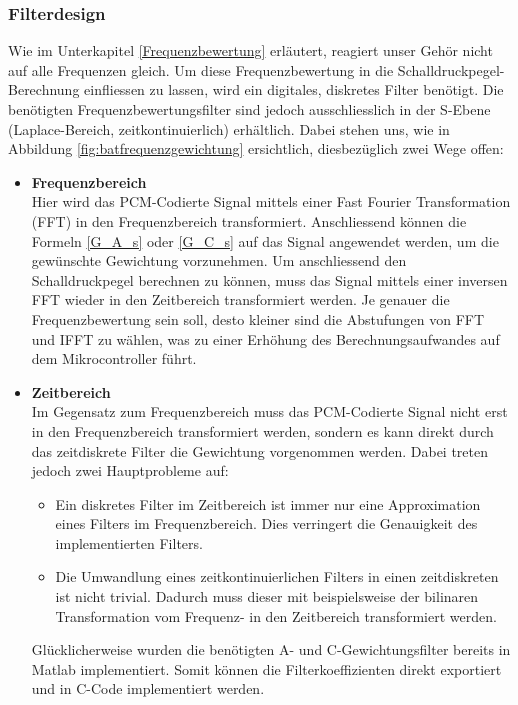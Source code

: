 \documentclass[12pt]{article}
\begin{document}
	\subsubsection*{Filterdesign}
	Wie im Unterkapitel \ref{Frequenzbewertung} erläutert, reagiert unser Gehör nicht auf alle Frequenzen gleich. Um diese Frequenzbewertung in die Schalldruckpegel-Berechnung einfliessen zu lassen, wird ein digitales, diskretes Filter benötigt. Die benötigten Frequenzbewertungsfilter sind jedoch ausschliesslich in der S-Ebene (Laplace-Bereich, zeitkontinuierlich) erhältlich. Dabei stehen uns, wie in Abbildung \ref{fig:batfrequenzgewichtung} ersichtlich, diesbezüglich zwei Wege offen:
	\begin{itemize}
		\item \textbf{Frequenzbereich} \\
		Hier wird das PCM-Codierte Signal mittels einer Fast Fourier Transformation (FFT) in den Frequenzbereich transformiert. Anschliessend können die Formeln \ref{G_A_s} oder \ref{G_C_s} auf das Signal angewendet werden, um die gewünschte Gewichtung vorzunehmen. Um anschliessend den Schalldruckpegel berechnen zu können, muss das Signal mittels einer inversen FFT wieder in den Zeitbereich transformiert werden. Je genauer die Frequenzbewertung sein soll, desto kleiner sind die Abstufungen von FFT und IFFT zu wählen, was zu einer Erhöhung des Berechnungsaufwandes auf dem Mikrocontroller führt.
		\item \textbf{Zeitbereich} \\
		Im Gegensatz zum Frequenzbereich muss das PCM-Codierte Signal nicht erst in den Frequenzbereich transformiert werden, sondern es kann direkt durch das zeitdiskrete Filter die Gewichtung vorgenommen werden. Dabei treten jedoch zwei Hauptprobleme auf: 
		\begin{itemize}
			\item Ein diskretes Filter im Zeitbereich ist immer nur eine Approximation eines Filters im Frequenzbereich. Dies verringert die Genauigkeit des implementierten Filters. 
			\item Die Umwandlung eines zeitkontinuierlichen Filters in einen zeitdiskreten ist nicht trivial. Dadurch muss dieser mit beispielsweise der bilinaren Transformation \cite{oppenheim_alan_v_zeitdiskrete_nodate} vom Frequenz- in den Zeitbereich transformiert werden. 
		\end{itemize} Glücklicherweise wurden die benötigten A- und C-Gewichtungsfilter bereits in Matlab implementiert. Somit können die Filterkoeffizienten direkt exportiert und in C-Code implementiert werden.
	\end{itemize}
\end{document}
